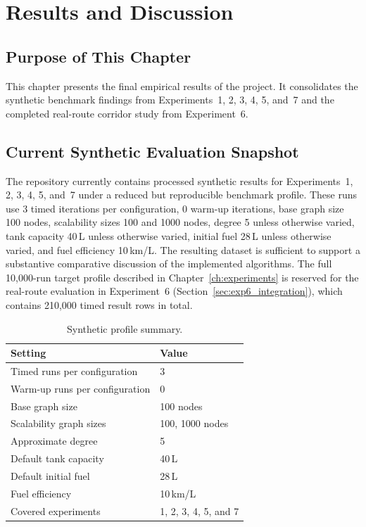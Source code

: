 \chapter{Results and Discussion}
\label{ch:results}

\section{Purpose of This Chapter}

This chapter presents the final empirical results of the project.
It consolidates the synthetic benchmark findings from Experiments~1, 2, 3, 4, 5, and~7 and
the completed real-route corridor study from Experiment~6.

\section{Current Synthetic Evaluation Snapshot}
\label{sec:current_synth_snapshot}

The repository currently contains processed synthetic results for Experiments~1, 2, 3, 4, 5,
and~7 under a reduced but reproducible benchmark profile.
These runs use 3 timed iterations per configuration, 0 warm-up iterations, base graph size
100 nodes, scalability sizes 100 and 1000 nodes, degree 5 unless otherwise varied, tank
capacity 40\,L unless otherwise varied, initial fuel 28\,L unless otherwise varied, and fuel
efficiency 10\,km/L.
The resulting dataset is sufficient to support a substantive comparative discussion of the
implemented algorithms.
The full 10{,}000-run target profile described in Chapter~\ref{ch:experiments} is reserved
for the real-route evaluation in Experiment~6 (Section~\ref{sec:exp6_integration}), which
contains 210{,}000 timed result rows in total.

\begin{table}[H]
    \centering
    \caption{Synthetic profile summary.}
    \label{tab:final_current_synth_profile}
    \begin{tabular}{ll}
        \toprule
        Setting & Value \\
        \midrule
        Timed runs per configuration & 3 \\
        Warm-up runs per configuration & 0 \\
        Base graph size & 100 nodes \\
        Scalability graph sizes & 100, 1000 nodes \\
        Approximate degree & 5 \\
        Default tank capacity & 40\,L \\
        Default initial fuel & 28\,L \\
        Fuel efficiency & 10\,km/L \\
        Covered experiments & 1, 2, 3, 4, 5, and 7 \\
        \bottomrule
    \end{tabular}
\end{table}

